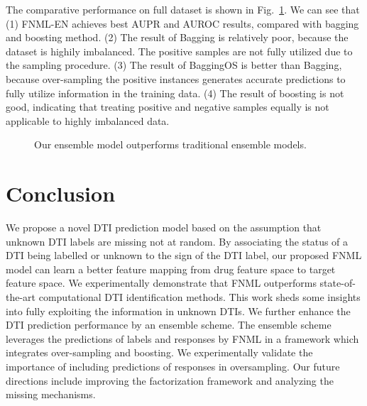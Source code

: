 \documentclass[conference]{IEEEtran}
\begin{document}
The comparative performance on full dataset is shown in Fig.~\ref{fig:ensemblecompare}. We can see that (1) FNML-EN achieves best AUPR and AUROC results, compared with bagging and boosting method. (2) The result of Bagging is relatively poor, because the dataset is highily imbalanced. The positive samples are not fully utilized due to the sampling procedure. (3) The result of BaggingOS is better than Bagging, because over-sampling the positive instances generates accurate predictions to fully utilize information in the training data. (4) The result of boosting is not good, indicating that treating positive and negative samples equally is not applicable to highly imbalanced data.
\begin{figure}[t]
\centering
{}
\vspace*{-10pt}
\caption{Our ensemble model outperforms traditional ensemble models.}\label{fig:ensemblecompare}
\end{figure}
\section{Conclusion}\label{sec:conclusion}

We propose a novel DTI prediction model based on the assumption that unknown DTI labels are missing not at random. By associating the status of a DTI being labelled or unknown to the sign of the DTI label, our proposed FNML model can learn a better feature mapping from drug feature space to target feature space. We experimentally demonstrate that FNML outperforms state-of-the-art computational DTI identification methods. This work sheds some insights into fully exploiting the information in unknown DTIs. We further enhance the DTI prediction performance by an ensemble scheme. The ensemble scheme leverages the predictions of labels and responses by FNML in a framework which integrates over-sampling and boosting. We experimentally validate the importance of including predictions of responses in oversampling. Our future directions include improving the factorization framework and analyzing the missing mechanisms. 
\end{document}
